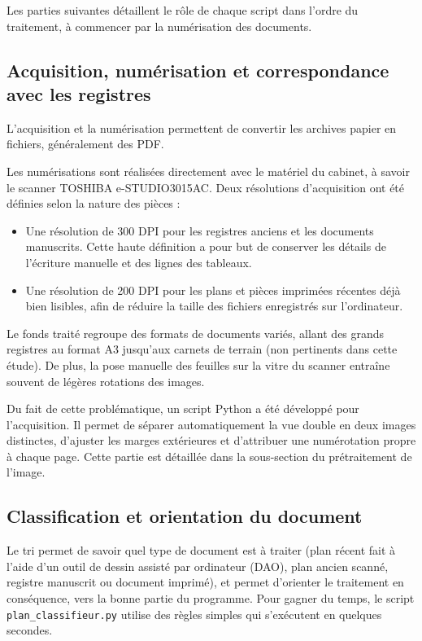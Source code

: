 Les parties suivantes détaillent le rôle de chaque script dans l'ordre du traitement, à commencer par la numérisation des documents.

\subsection{Acquisition, numérisation et correspondance avec les registres}

L'acquisition et la numérisation permettent de convertir les archives papier en fichiers, généralement des PDF. 

Les numérisations sont réalisées directement avec le matériel du cabinet, à savoir le scanner  TOSHIBA e-STUDIO3015AC. Deux résolutions d'acquisition ont été définies selon la nature des pièces :
\begin{itemize}
  \item Une résolution de 300 DPI pour les registres anciens et les documents manuscrits. Cette haute définition a pour but de conserver les détails de l'écriture manuelle et des lignes des tableaux.
  \item Une résolution de 200 DPI pour les plans et pièces imprimées récentes déjà bien lisibles, afin de réduire la taille des fichiers enregistrés sur l'ordinateur.
\end{itemize}

Le fonds traité regroupe des formats de documents variés, allant des grands registres au format A3 jusqu'aux carnets de terrain (non pertinents dans cette étude). De plus, la pose manuelle des feuilles sur la vitre du scanner entraîne souvent de légères rotations des images.

Du fait de cette problématique, un script Python a été développé pour l'acquisition. Il permet de séparer automatiquement la vue double en deux images distinctes, d'ajuster les marges extérieures et d'attribuer une numérotation propre à chaque page. Cette partie est détaillée dans la sous-section du prétraitement de l'image.


\subsection{Classification et orientation du document}

Le tri permet de savoir quel type de document est à traiter (plan récent fait à l'aide d'un outil de dessin assisté par ordinateur (DAO), plan ancien scanné, registre manuscrit ou document imprimé), et permet d'orienter le traitement en conséquence, vers la bonne partie du programme. Pour gagner du temps, le script \texttt{plan\_classifieur.py} utilise des règles simples qui s'exécutent en quelques secondes.

